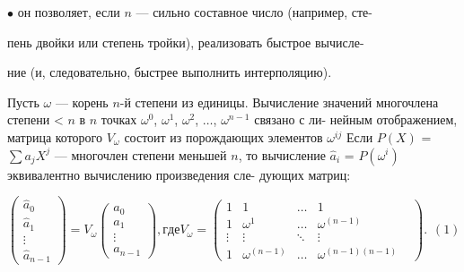 \vspace{0pt}$\bullet$ \hspace{3pt}он позволяет, если $n$ --- сильно составное число (например, сте­- \ 

\vspace{0pt}\hspace{8pt} пень двойки или степень тройки), реализовать быстрое вычисле­- \ 

\vspace{0pt}\hspace{8pt} ние (и, следовательно, быстрее выполнить интерполяцию).\ 

\vspace{1pt}Пусть $\omega$ --- корень $n$-й степени из единицы. Вычисление значений \linebreak
многочлена степени < $n$ в $n$ точках $\omega^0$, $\omega^1$, $\omega^2$, $\dots$, $\omega^{n-1}$  связано с ли­- \linebreak
нейным отображением, матрица которого $V_\omega$ состоит из порождающих \linebreak
элементов $\omega^{ij}$ Если $P(X)$ = $\sum a_j X^j$ --- многочлен степени меньшей $n$, \linebreak
то вычисление $\hat a_i$ = $P(\omega^i)$ эквивалентно вычислению произведения сле­- \linebreak
дующих матриц:

\[
\begin{pmatrix} \hat a_0 \\ \hat a_1 \\ \vdots  \\ \hat a_{n-1}  \end{pmatrix} = V_\omega 
\begin{pmatrix} a_0 \\ a_1 \\ \vdots  \\ a_{n-1}  \end{pmatrix}, где V_\omega =
\begin{pmatrix} 1 & 1 & \hdots & 1 \\ 1 & \omega^1 & \hdots & \omega^{(n - 1)} \\ \vdots & \vdots & \ddots & \vdots & \\ 1 & \omega^{(n - 1)} & \hdots & \omega^{(n - 1)(n - 1)} \end{pmatrix}.\hspace{5pt} (1)
\] 

\newpage
{}

